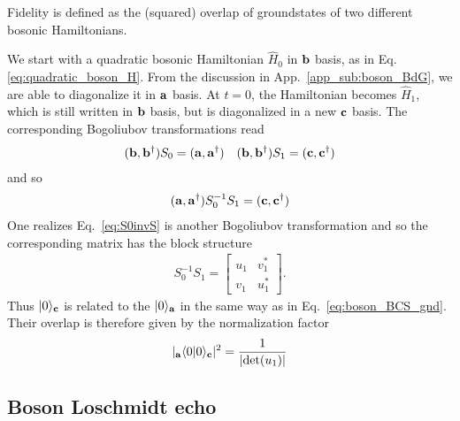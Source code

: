 Fidelity is defined as the (squared) overlap of groundstates of two different bosonic Hamiltonians. 

We start with a quadratic bosonic Hamiltonian $\hat{H}_0$ in ${\bf b}$ basis, as in Eq.\eqref{eq:quadratic_boson_H}. From the discussion in App.~\ref{app_sub:boson_BdG}, we are able to diagonalize it in ${\bf a}$ basis. At $t=0$, the Hamiltonian becomes $\hat{H}_1$, which is still written in ${\bf b}$ basis, but is diagonalized in a new ${\bf c}$ basis. The corresponding Bogoliubov transformations read
\begin{eqnarray}\begin{aligned}
\label{eq:two_BdG}
({\bf b} , {\bf b}^\dagger)S_0=({\bf a} , {\bf a}^\dagger)\quad
({\bf b} , {\bf b}^\dagger)S_1=({\bf c} , {\bf c}^\dagger)
\end{aligned}\end{eqnarray}
and so
\begin{eqnarray}\begin{aligned}
\label{eq:S0invS}
({\bf a} , {\bf a}^\dagger)S_0^{-1}S_1=({\bf c} , {\bf c}^\dagger)
\end{aligned}\end{eqnarray}
One realizes Eq.~\eqref{eq:S0invS} is another Bogoliubov transformation and so the corresponding matrix has the block structure
\begin{eqnarray}
S_0^{-1}S_1=\begin{bmatrix}
u_1 & v_1^*\\
v_1 & u_1^*
\end{bmatrix}.
\end{eqnarray}
Thus $|0\rangle_{\bf c}$ is related to the $|0\rangle_{{\bf a}}$ in the same way as in Eq.~\eqref{eq:boson_BCS_gnd}. Their overlap is therefore given by the normalization factor
\begin{eqnarray}\begin{aligned}
|_{\bf a}\langle0|0\rangle_{\bf c}|^2=\frac{1}{|\text{det}(u_1)|}
\end{aligned}\end{eqnarray}

\subsection{Boson Loschmidt echo}
\label{app_sub:boson_Loschmidt_echo}

